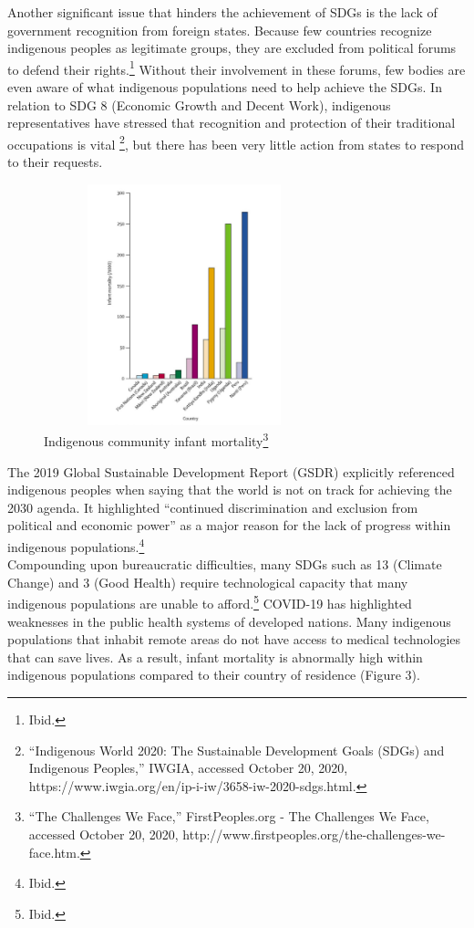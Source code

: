 \documentclass[10pt, letterpaper]{article}
\begin{document}
Another significant issue that hinders the achievement of SDGs is the
lack of government recognition from foreign states. Because few
countries recognize indigenous peoples as legitimate groups, they are
excluded from political forums to defend their rights.\footnote{Ibid.}
Without their involvement in these forums, few bodies are even aware of
what indigenous populations need to help achieve the SDGs. In relation
to SDG 8 (Economic Growth and Decent Work), indigenous representatives
have stressed that recognition and protection of their traditional
occupations is vital \footnote{``Indigenous World 2020: The Sustainable
  Development Goals (SDGs) and Indigenous Peoples,'' IWGIA, accessed
  October 20, 2020,
  https://www.iwgia.org/en/ip-i-iw/3658-iw-2020-sdgs.html.}, but there
has been very little action from states to respond to their requests. \\

\begin{figure}
\centering
\includegraphics[width=3.20903in,height=2.75in]{Picture3.png} 
  \caption{Indigenous community infant mortality\footnote{``The
  Challenges We Face,'' FirstPeoples.org - The Challenges We Face,
  accessed October 20, 2020,
  http://www.firstpeoples.org/the-challenges-we-face.htm.}}
\end{figure}

The 2019 Global Sustainable Development Report (GSDR) explicitly
referenced indigenous peoples when saying that the world is not on track
for achieving the 2030 agenda. It highlighted ``continued discrimination
and exclusion from political and economic power'' as a major reason for
the lack of progress within indigenous populations.\footnote{Ibid.} \\

Compounding upon bureaucratic difficulties, many SDGs such as 13
(Climate Change) and 3 (Good Health) require technological capacity that
many indigenous populations are unable to afford.\footnote{Ibid.}
COVID-19 has highlighted weaknesses in the public health systems of
developed nations. Many indigenous populations that inhabit remote areas
do not have access to medical technologies that can save lives. As a
result, infant mortality is abnormally high within indigenous
populations compared to their country of residence (Figure 3). \\
\end{document}

